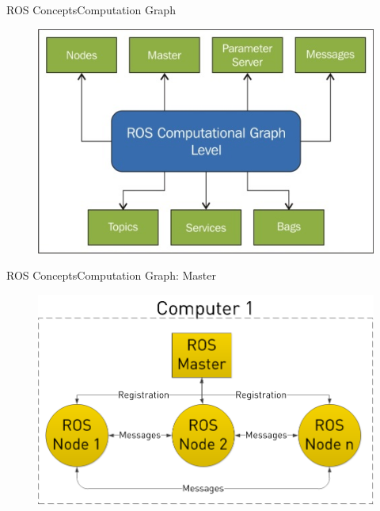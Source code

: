 \documentclass{beamer}
\begin{document}
\begin{frame}{ROS Concepts}{Computation Graph}
\begin{figure}
\centering
\includegraphics[scale=2]{figs/img/computaiongraph}
\end{figure}
  
\end{frame}
\begin{frame}{ROS Concepts}{Computation Graph: Master}
\begin{figure}
\centering
\includegraphics[scale=0.35]{figs/img/master}
\end{figure}

\end{frame}
\end{document}
